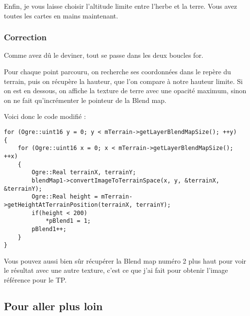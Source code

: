 \documentclass[10pt,a4paper]{report}
\begin{document}
Enfin, je vous laisse choisir l'altitude limite entre l'herbe et la terre. Vous avez toutes les cartes en mains maintenant.

























\subsubsection{Correction}

Comme avez d\^u le deviner, tout se passe dans les deux boucles for.

Pour chaque point parcouru, on recherche ses coordonn\'ees dans le rep\`ere du terrain, puis on r\'ecup\`ere la hauteur, que l'on compare \`a notre hauteur limite. Si on est en dessous, on affiche la texture de terre avec une opacit\'e maximum, sinon on ne fait qu'incr\'ementer le pointeur de la Blend map.

Voici donc le code modifi\'e :

\begin{lstlisting}[caption={Attribution de la transparence d\'esir\'ee sur tous les points du calque selon leur position}]
for (Ogre::uint16 y = 0; y < mTerrain->getLayerBlendMapSize(); ++y)
{
    for (Ogre::uint16 x = 0; x < mTerrain->getLayerBlendMapSize(); ++x)
    {
        Ogre::Real terrainX, terrainY;
        blendMap1->convertImageToTerrainSpace(x, y, &terrainX, &terrainY);
        Ogre::Real height = mTerrain->getHeightAtTerrainPosition(terrainX, terrainY);
        if(height < 200)
            *pBlend1 = 1;
        pBlend1++;
    }
}
\end{lstlisting}

Vous pouvez aussi bien s\^ur r\'ecup\'erer la Blend map num\'ero 2 plus haut pour voir le r\'esultat avec une autre texture, c'est ce que j'ai fait pour obtenir l'image r\'ef\'erence pour le TP.





\subsection{Pour aller plus loin}
\end{document}
